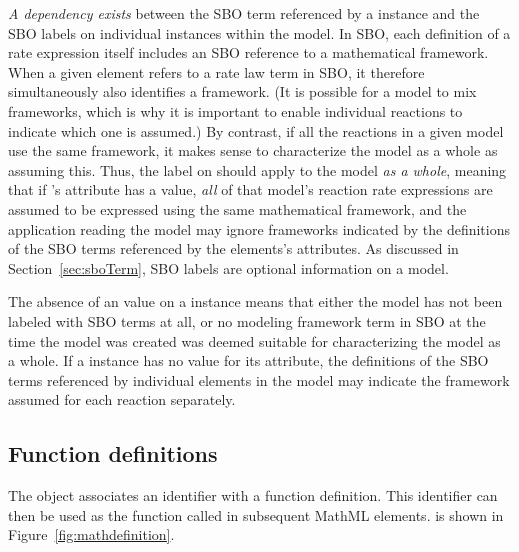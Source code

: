 \emph{A dependency exists} between the SBO term referenced by a
\Model instance and the SBO labels on individual \KineticLaw
instances within the model.  In SBO, each definition of a rate
expression itself includes an SBO reference to a mathematical
framework.  When a given \KineticLaw element refers to a rate law
term in SBO, it therefore simultaneously also identifies a
framework.  (It is possible for a model to mix frameworks, which
is why it is important to enable individual reactions to indicate
which one is assumed.)  By contrast, if all the reactions in a
given model use the same framework, it makes sense to characterize
the model as a whole as assuming this.  Thus, the label on \Model
should apply to the model \emph{as a whole}, meaning that if
\Model's  attribute has a value, \emph{all} of that
model's reaction rate expressions are assumed to be expressed
using the same mathematical framework, and the application reading
the model may ignore frameworks indicated by the definitions of
the SBO terms referenced by the \KineticLaw elements's
 attributes.  As discussed in
Section~\ref{sec:sboTerm}, SBO labels are optional information on
a model.

The absence of an  value on a \Model instance means
that either the model has not been labeled with SBO terms at all,
or no modeling framework term in SBO at the time the model was
created was deemed suitable for characterizing the model as a
whole.  If a \Model instance has no value for its 
attribute, the definitions of the SBO terms referenced by
individual \KineticLaw elements in the model may indicate the
framework assumed for each reaction separately.


\subsection{Function definitions}
\label{sec:functiondefinition}

The \FunctionDefinition object associates an identifier with a
function definition.  This identifier can then be used as the
function called in subsequent MathML  elements.
\FunctionDefinition is shown in Figure~\vref{fig:mathdefinition}.

